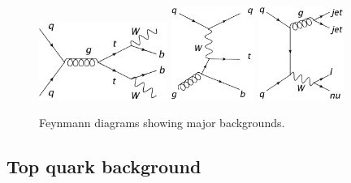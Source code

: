\begin{figure}[htbp]
	\centering
		\includegraphics[width=0.37\textwidth]{Figures/FD-tt.png}
		\includegraphics[width=0.245\textwidth]{Figures/FD-st.png}
		\includegraphics[width=0.25\textwidth]{Figures/FD-WJ.png}
	\caption[Feynmann diagrams showing major backgrounds]{Feynmann diagrams showing major backgrounds.}
	\label{fig:backgrounds}
\end{figure}

\subsection{Top quark background}

